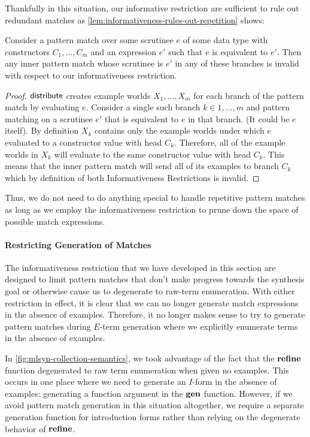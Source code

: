 Thankfully in this situation, our informative restriction are sufficient to rule out redundant matches as \autoref{lem:informativeness-rules-out-repetition} shows:
\begin{proofenv}
  \begin{lemma}
    Consider a pattern match over some scrutinee $e$ of some data type with constructors $C_1, …, C_m$ and an expression $e'$ such that $e$ is equivalent to $e'$.
    Then any inner pattern match whose scrutinee is $e'$ in any of these branches is invalid with respect to our informativeness restriction.
    \label{lem:informativeness-rules-out-repetition}
  \end{lemma}
  \begin{proof}
    $\mathsf{distribute}$ creates example worlds $Χ_1, …, Χ_m$ for each branch of the pattern match by evaluating $e$.
    Consider a single such branch $k ∈ 1, …, m$ and pattern matching on a scrutinee $e'$ that is equivalent to $e$ in that branch.
    (It could be $e$ itself).
    By definition $Χ_k$ contains only the example worlds under which $e$ evaluated to a constructor value with head $C_k$.
    Therefore, all of the example worlds in $Χ_k$ will evaluate to the same constructor value with head $C_k$.
    This means that the inner pattern match will send all of its examples to branch $C_k$ which by definition of both Informativeness Restrictions is invalid.
  \end{proof}
\end{proofenv}
Thus, we do not need to do anything special to handle repetitive pattern matches as long as we employ the informativeness restriction to prune down the space of possible match expressions.

\paragraph{Restricting Generation of Matches}

The informativeness restriction that we have developed in this section are designed to limit pattern matches that don't make progress towards the synthesis goal or otherwise cause us to degenerate to raw-term enumeration.
With either restriction in effect, it is clear that we can no longer generate match expressions in the absence of examples.
Therefore, it no longer makes sense to try to generate pattern matches during $E$-term generation where we explicitly enumerate terms in the absence of examples.

In \autoref{fig:mlsyn-collection-semantics}, we took advantage of the fact that the $\mathbf{refine}$ function degenerated to raw term enumeration when given no examples.
This occurs in one place where we need to generate an $I$-form in the absence of examples: generating a function argument in the $\mathbf{gen}$ function.
However, if we avoid pattern match generation in this situation altogether, we require a separate generation function for introduction forms rather than relying on the degenerate behavior of $\mathbf{refine}$.

